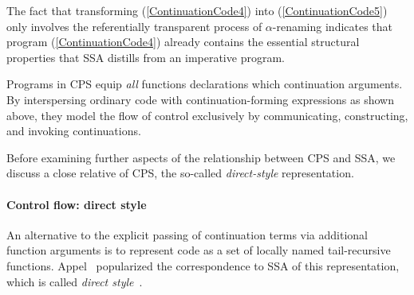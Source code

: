  The fact that transforming (\ref{ContinuationCode4}) into
(\ref{ContinuationCode5}) only involves the referentially transparent
process of $\alpha$-renaming indicates that program
(\ref{ContinuationCode4}) already contains the essential structural
properties that SSA distills from an imperative program.

Programs in CPS equip \emph{all} functions declarations which
continuation arguments. By interspersing ordinary code with
continuation-forming expressions as shown above, they model the flow
of control exclusively by communicating, constructing, and invoking
continuations.

Before examining further aspects of the relationship between CPS and
SSA, we discuss a close relative of CPS, the so-called
\emph{direct-style} representation.


\paragraph{Control flow: direct style}

An alternative to the explicit passing of continuation terms via
additional function arguments is to represent code as a set of locally
named tail-recursive functions. Appel~\cite{Appel98:SSA} popularized
the correspondence to SSA of this representation, which is called
\emph{direct style}~\cite{Reynolds1974}.

